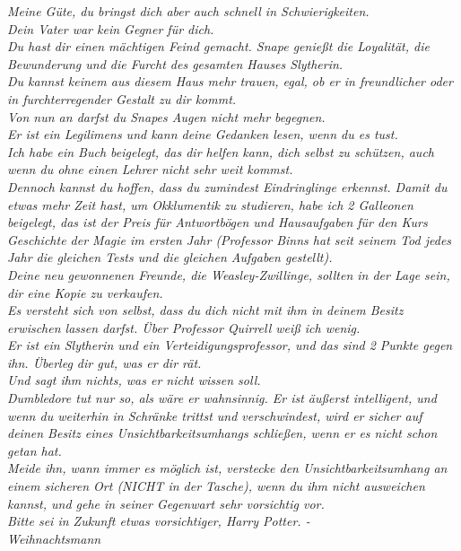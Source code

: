 {\emph{Meine Güte, du bringst dich aber auch schnell in Schwierigkeiten.\\ Dein Vater war kein Gegner für dich.}\\ \emph{Du hast dir einen mächtigen Feind gemacht. Snape genießt die Loyalität, die Bewunderung und die Furcht des gesamten Hauses Slytherin.\\ Du kannst keinem aus diesem Haus mehr trauen, egal, ob er in freundlicher oder in furchterregender Gestalt zu dir kommt.\\ Von nun an darfst du Snapes Augen nicht mehr begegnen.}\\ \emph{Er ist ein Legilimens und kann deine Gedanken lesen, wenn du es tust.\\ Ich habe ein Buch beigelegt, das dir helfen kann, dich selbst zu schützen, auch wenn du ohne einen Lehrer nicht sehr weit kommst.\\ Dennoch kannst du hoffen, dass du zumindest Eindringlinge erkennst. Damit du etwas mehr Zeit hast, um Okklumentik zu studieren, habe ich 2 Galleonen beigelegt, das ist der Preis für Antwortbögen und Hausaufgaben für den Kurs Geschichte der Magie im ersten Jahr (Professor Binns hat seit seinem Tod jedes Jahr die gleichen Tests und die gleichen Aufgaben gestellt).\\ Deine neu gewonnenen Freunde, die Weasley-Zwillinge, sollten in der Lage sein, dir eine Kopie zu verkaufen.\\ Es versteht sich von selbst, dass du dich nicht mit ihm in deinem Besitz erwischen lassen darfst. Über Professor Quirrell weiß ich wenig.\\ Er ist ein Slytherin und ein Verteidigungsprofessor, und das sind 2 Punkte gegen ihn. Überleg dir gut, was er dir rät.\\ Und sagt ihm nichts, was er nicht wissen soll.}\\ \emph{Dumbledore tut nur so, als wäre er wahnsinnig. Er ist äußerst intelligent, und wenn du weiterhin in Schränke trittst und verschwindest, wird er sicher auf deinen Besitz eines Unsichtbarkeitsumhangs schließen, wenn er es nicht schon getan hat.}\\ \emph{\hfill\break Meide ihn, wann immer es möglich ist, verstecke den Unsichtbarkeitsumhang an einem sicheren Ort (NICHT in der Tasche), wenn du ihm nicht ausweichen kannst, und gehe in seiner Gegenwart sehr vorsichtig vor.\\ Bitte sei in Zukunft etwas vorsichtiger, Harry Potter. -}\\ \emph{Weihnachtsmann}

}
